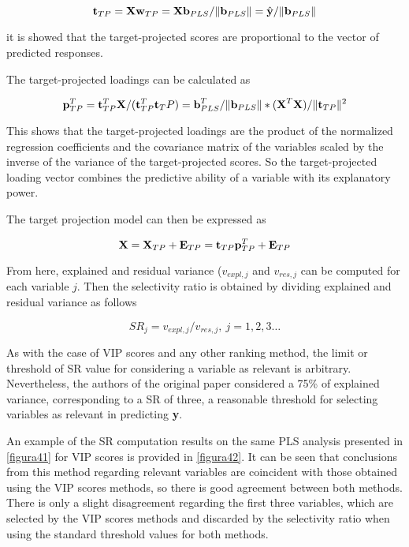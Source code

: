 \begin{equation}
\textbf{\text{t}}_{TP}=\textbf{\text{Xw}}_{TP}=\textbf{\text{Xb}}_{PLS}/\|\textbf{\text{b}}_{PLS}\|=\hat{\textbf{\text{y}}}/\|\textbf{\text{b}}_{PLS}\|
\label{equation31}
\end{equation}

it is showed that the target-projected scores are proportional to the vector of predicted responses.

The target-projected loadings can be calculated as

\begin{equation}
\textbf{\text{p}}^T_{TP}=\textbf{\text{t}}^T_{TP}\textbf{\text{X}}/(\textbf{\text{t}}^T_{TP}\textbf{\text{t}}_TP)=\textbf{\text{b}}^T_{PLS}/\|\textbf{\text{b}}_{PLS}\|*(\textbf{\text{X}}^T\textbf{\text{X}})/\|\textbf{\text{t}}_{TP}\|^2
\label{equation32}
\end{equation}

This shows that the target-projected loadings are the product of the normalized regression coefficients and the covariance matrix of the variables scaled by the inverse of the variance of the target-projected scores. So the target-projected loading vector combines the predictive ability of a variable with its explanatory power.

The target projection model can then be expressed as

\begin{equation}
\textbf{\text{X}}=\textbf{\text{X}}_{TP}+\textbf{\text{E}}_{TP}=\textbf{\text{t}}_{TP}\textbf{\text{p}}^T_{TP}+\textbf{\text{E}}_{TP}
\label{equation33}
\end{equation}

From here, explained and residual variance ($v_{expl,j}$ and $v_{res,j}$ can be computed for each variable $j$. Then the selectivity ratio is obtained by dividing explained and residual variance as follows

\begin{equation}
SR_j=v_{expl,j}/v_{res,j}, \ j=1,2,3 \dots
\label{equation34}
\end{equation}

As with the case of VIP scores and any other ranking method, the limit or threshold of SR value for considering a variable as relevant is arbitrary. Nevertheless, the authors of the original paper considered a 75\% of explained variance, corresponding to a SR of three, a reasonable threshold for selecting variables as relevant in predicting \textbf{y}.

An example of the SR computation results on the same PLS analysis presented in \autoref{figura41} for VIP scores is provided in \autoref{figura42}. It can be seen that conclusions from this method regarding relevant variables are coincident with those obtained using the VIP scores methods, so there is good agreement between both methods. There is only a slight disagreement regarding the first three variables, which are selected by the VIP scores methods and discarded by the selectivity ratio when using the standard threshold values for both methods.

